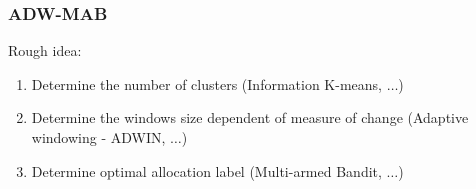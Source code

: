 \documentclass[paper=a4, fontsize=12pt]{scrartcl}
\begin{document}
\subsubsection*{ADW-MAB}
Rough idea:
\begin{enumerate}
  \item Determine the number of clusters (Information K-means, $\ldots$)
  \item Determine the windows size dependent of measure of change (Adaptive windowing - ADWIN, $\ldots$)
  \item Determine optimal allocation label (Multi-armed Bandit, $\ldots$)
\end{enumerate}
\end{document}
